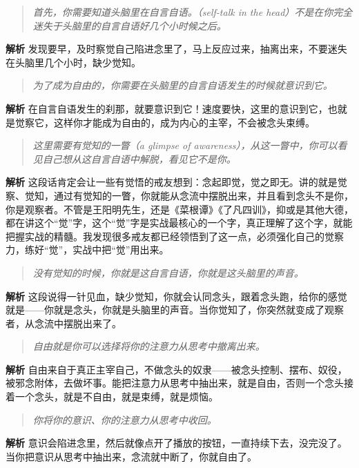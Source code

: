\begin{quote}\it
    首先，你需要知道头脑里在自言自语。（self-talk in the head）不是在你完全迷失于头脑里的自言自语好几个小时候之后。
\end{quote}

\textbf{解析} 发现要早，及时察觉自己陷进念里了，马上反应过来，抽离出来，不要迷失在头脑里几个小时，缺少觉知。

\begin{quote}\it
    为了成为自由的，你需要在头脑里的自言自语发生的时候就意识到它。
\end{quote}

\textbf{解析} 在自言自语发生的刹那，就要意识到它！速度要快，这里的意识到它，也就是觉察它，这样你才能成为自由的，成为内心的主宰，不会被念头束缚。

\begin{quote}\it
    这里需要有觉知的一瞥（a glimpse of awareness），从这一瞥中，你可以看见自己想从这自言自语中解脱，看见它不是你。
\end{quote}

\textbf{解析} 这段话肯定会让一些有觉悟的戒友想到：念起即觉，觉之即无。讲的就是觉察、觉知，通过有觉知的一瞥，你就能从念流中摆脱出来，并且看到念头不是你，你是观察者。不管是王阳明先生，还是《菜根谭》《了凡四训》，抑或是其他大德，都在讲这个“觉”字，这个“觉”字是实战最核心的一个字，真正理解了这个字，就能把握实战的精髓。我发现很多戒友都已经领悟到了这一点，必须强化自己的觉察力，练好“觉”，实战中把“觉”用出来。

\begin{quote}\it
    没有觉知的时候，你就是这自言自语，你就是这头脑里的声音。
\end{quote}

\textbf{解析} 这段说得一针见血，缺少觉知，你就会认同念头，跟着念头跑，给你的感觉就是——你就是念头，你就是头脑里的声音。当你觉知了，你突然就变成了观察者，从念流中摆脱出来了。

\begin{quote}\it
    自由就是你可以选择将你的注意力从思考中撤离出来。
\end{quote}

\textbf{解析} 自由来自于真正主宰自己，不做念头的奴隶——被念头控制、摆布、奴役，被邪念附体，去做坏事。能把注意力从思考中抽出来，就是自由，否则一个念头接着一个念头，就是不自由，就是束缚，就是烦恼。

\begin{quote}\it
    你将你的意识、你的注意力从思考中收回。
\end{quote}

\textbf{解析} 意识会陷进念里，然后就像点开了播放的按钮，一直持续下去，没完没了。当你把意识从思考中抽出来，念流就中断了，你就自由了。

